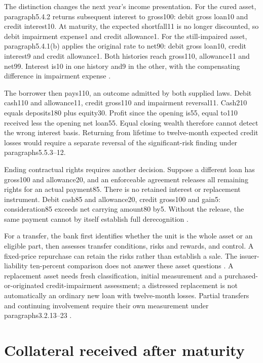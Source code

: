 The distinction changes the next year's income presentation. For the cured
asset, paragraph5.4.2 returns subsequent interest to gross100: debit gross
loan10 and credit interest10. At maturity, the expected shortfall11 is no
longer discounted, so debit impairment expense1 and credit allowance1.
For the still-impaired asset, paragraph5.4.1(b) applies the original rate to
net90: debit gross loan10, credit interest9 and credit allowance1.
Both histories reach gross110, allowance11 and net99. Interest is10 in one
history and9 in the other, with the compensating difference in impairment
expense \citep[paragraphs5.4.1--2]{aasb9dated}.

The borrower then pays110, an outcome admitted by both supplied laws.
Debit cash110 and allowance11, credit gross110 and impairment reversal11.
Cash210 equals deposits180 plus equity30. Profit since the opening is55,
equal to110 received less the opening net loan55. Equal closing wealth
therefore cannot detect the wrong interest basis. Returning from lifetime
to twelve-month expected credit losses would require a separate reversal of
the significant-risk finding under paragraphs5.5.3--12.

Ending contractual rights requires another decision. Suppose a different
loan has gross100 and allowance20, and an enforceable agreement releases
all remaining rights for an actual payment85. There is no retained interest
or replacement instrument. Debit cash85 and allowance20, credit gross100
and gain5: consideration85 exceeds net carrying amount80 by5.
Without the release, the same payment cannot by itself establish full
derecognition \citep[paragraphs3.2.3 and3.2.12]{aasb9dated}.

For a transfer, the bank first identifies whether the unit is the whole
asset or an eligible part, then assesses transfer conditions, risks and
rewards, and control. A fixed-price repurchase can retain the risks rather
than establish a sale. The issuer-liability ten-percent comparison does not
answer these asset questions \citep[paragraphs3.2.2--7]{aasb9dated}.
A replacement asset needs fresh classification, initial measurement and a
purchased-or-originated credit-impairment assessment; a distressed replacement
is not automatically an ordinary new loan with twelve-month losses.
Partial transfers and continuing involvement require their own measurement
under paragraphs3.2.13--23 \citep[B5.5.25--26]{aasb9dated}.

\section{Collateral received after maturity}\label{sec:bank-late-collateral}


